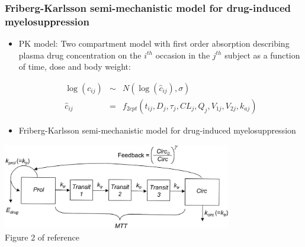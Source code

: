 \documentclass{beamer}
\begin{document}
\begin{frame}
  \frametitle{Friberg-Karlsson semi-mechanistic model for
drug-induced myelosuppression}

  \begin{itemize}
\item PK model: Two compartment model with first order absorption describing
  plasma drug concentration on the $i^{th}$ occasion in the $j^{th}$
  subject as a function of time, dose and body weight:
  \begin{scriptsize}
    \begin{eqnarray*}
      \log\left(c_{ij}\right) &\sim& N\left(\log\left(\hat{c}_{ij}\right),\sigma\right) \\
      \hat{c}_{ij} &=&
                       f_{2cpt}\left(t_{ij},D_j,\tau_j,CL_j,Q_j,V_{1j},V_{2j},k_{aj}\right) 
    \end{eqnarray*}
  \end{scriptsize}
  \item Friberg-Karlsson semi-mechanistic model for
drug-induced myelosuppression \cite{3181,2364,2518,3187,3188,3537}
  \end{itemize}
\vspace{-6pt}
\begin{center}
\includegraphics[width=0.75\textwidth]{graphics/neutrophilModel.jpg}\\
Figure 2 of reference \cite{3181}
\end{center}

\end{frame}
\end{document}
